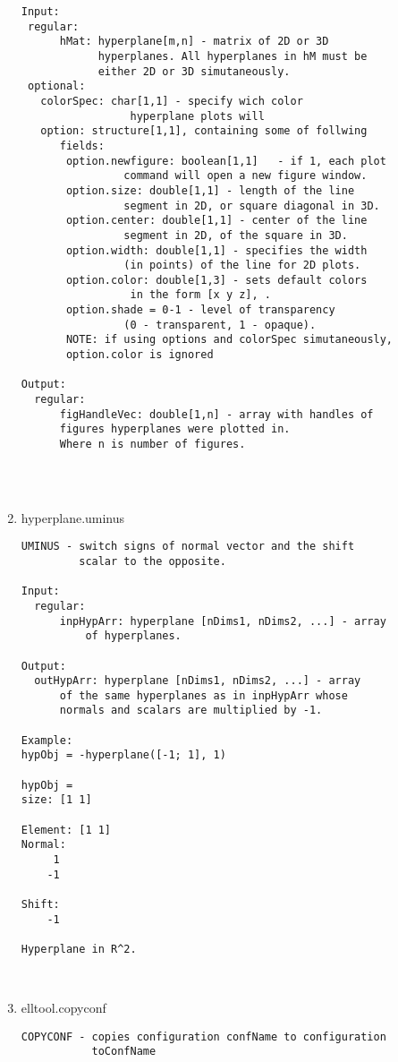 \begin{enumerate}
\begin{lstlisting}
Input:
 regular:
      hMat: hyperplane[m,n] - matrix of 2D or 3D
            hyperplanes. All hyperplanes in hM must be
            either 2D or 3D simutaneously.
 optional:
   colorSpec: char[1,1] - specify wich color
                 hyperplane plots will
   option: structure[1,1], containing some of follwing
      fields:
       option.newfigure: boolean[1,1]   - if 1, each plot
                command will open a new figure window.
       option.size: double[1,1] - length of the line
                segment in 2D, or square diagonal in 3D.
       option.center: double[1,1] - center of the line
                segment in 2D, of the square in 3D.
       option.width: double[1,1] - specifies the width
                (in points) of the line for 2D plots.
       option.color: double[1,3] - sets default colors
                 in the form [x y z], .
       option.shade = 0-1 - level of transparency
                (0 - transparent, 1 - opaque).
       NOTE: if using options and colorSpec simutaneously,
       option.color is ignored

Output:
  regular:
      figHandleVec: double[1,n] - array with handles of
      figures hyperplanes were plotted in.
      Where n is number of figures.




\end{lstlisting}
\fontfamily{\familydefault}
\selectfont
\item {hyperplane.uminus}
\selectfont
\begin{lstlisting}
UMINUS - switch signs of normal vector and the shift
         scalar to the opposite.

Input:
  regular:
      inpHypArr: hyperplane [nDims1, nDims2, ...] - array
          of hyperplanes.

Output:
  outHypArr: hyperplane [nDims1, nDims2, ...] - array
      of the same hyperplanes as in inpHypArr whose
      normals and scalars are multiplied by -1.

Example:
hypObj = -hyperplane([-1; 1], 1)

hypObj =
size: [1 1]

Element: [1 1]
Normal:
     1
    -1

Shift:
    -1

Hyperplane in R^2.



\end{lstlisting}
\fontfamily{\familydefault}
\selectfont
\item {elltool.copyconf}
\selectfont
\begin{lstlisting}
COPYCONF - copies configuration confName to configuration
           toConfName


\end{lstlisting}
\end{enumerate}

